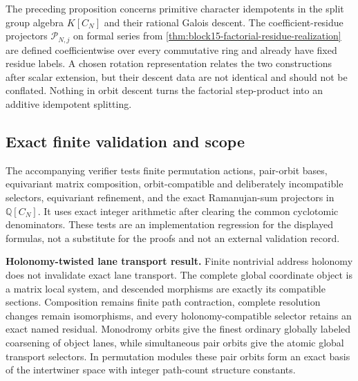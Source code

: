 \begin{boundary}
\label{bnd:block16-cyclic-character-residue-distinction}
The preceding proposition concerns primitive character idempotents in the
split group algebra \(K[C_N]\) and their rational Galois descent.  The
coefficient-residue projectors \(\mathcal P_{N,j}\) on formal series from
\cref{thm:block15-factorial-residue-realization} are defined coefficientwise
over every commutative ring and already have fixed residue labels.  A chosen
rotation representation relates the two constructions after scalar extension,
but their descent data are not identical and should not be conflated.  Nothing
in orbit descent turns the factorial step-product into an additive idempotent
splitting.
\end{boundary}

\subsection{Exact finite validation and scope}
\label{subsec:block16-validation-scope}

The accompanying verifier tests finite permutation actions, pair-orbit bases,
equivariant matrix composition, orbit-compatible and deliberately incompatible
selectors, equivariant refinement, and the exact Ramanujan-sum projectors in
\(\mathbb Q[C_N]\).  It uses exact integer arithmetic after clearing the common cyclotomic
denominators.  These tests are
an implementation regression for the displayed formulas, not a substitute for
the proofs and not an external validation record.


\begin{resultbox}
\textbf{Holonomy-twisted lane transport result.}
Finite nontrivial address holonomy does not invalidate exact lane transport.
The complete global coordinate object is a matrix local system, and descended
morphisms are exactly its compatible sections.  Composition remains finite
path contraction, complete resolution changes remain isomorphisms, and every
holonomy-compatible selector retains an exact named residual.  Monodromy
orbits give the finest ordinary globally labeled coarsening of object lanes,
while simultaneous pair orbits give the atomic global transport selectors.  In
permutation modules these pair orbits form an exact basis of the intertwiner
space with integer path-count structure constants.
\end{resultbox}

